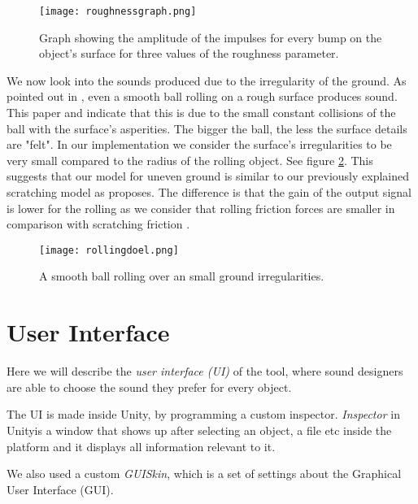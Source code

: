 \begin{figure}[H]
  \centering
    \texttt{[image: roughnessgraph.png]}
      \caption{Graph showing the amplitude of the impulses for every bump on the object's surface for three values of the roughness parameter.}
      \label{fig:roughnessgraph}
\end{figure} 

We now look into the sounds produced due to the irregularity of the ground. As pointed out in \cite{van2001foleyautomatic}, even a smooth ball rolling on a rough surface produces sound. This paper and \cite{rath2003expressive} indicate that this is due to the small constant collisions of the ball with the surface's asperities. The bigger the ball, the less the surface details are "felt". In our implementation we consider the surface's irregularities to be very small compared to the radius of the rolling object. See figure \ref{fig:rollingdoel}. This suggests that our model for uneven ground is similar to our previously explained scratching model as \cite{van2001foleyautomatic} proposes. The difference is that the gain of the output signal is lower for the rolling as we consider that rolling friction forces are smaller in comparison with scratching friction \cite{mehtas}.

\begin{figure}[H]
  \centering
    \texttt{[image: rollingdoel.png]}
      \caption{A smooth ball rolling over an small ground irregularities.}
      \label{fig:rollingdoel}
\end{figure} 

\section{User Interface}
Here we will describe the \textit{user interface (UI)} of the tool, where sound designers are able to choose the sound they prefer for every object.

The UI is made inside Unity\textregistered, by programming a custom inspector. \textit{Inspector} in Unity\textregistered is a window that shows up after selecting an object, a file etc inside the platform and it displays all information relevant to it.

We also used a custom \textit{GUISkin}, which is a set of settings about the Graphical User Interface (GUI). 

